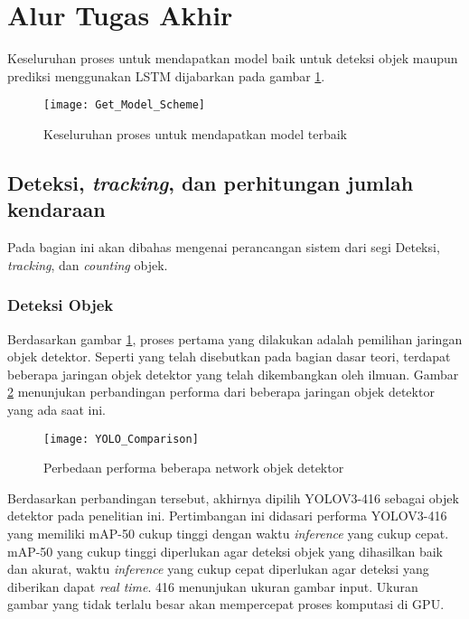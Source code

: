 \documentclass[../thesis.tex]{subfiles}
\begin{document}
\section{Alur Tugas Akhir}
Keseluruhan proses untuk mendapatkan model baik untuk deteksi objek maupun prediksi menggunakan LSTM dijabarkan pada gambar \ref{get_model_scheme}.
\begin{figure}[htp]
	\centering
	\texttt{[image: Get\_Model\_Scheme]}
	\caption{Keseluruhan proses untuk mendapatkan model terbaik}
	\label{get_model_scheme}
\end{figure}

\subsection{Deteksi, \textit{tracking}, dan perhitungan jumlah kendaraan}
Pada bagian ini akan dibahas mengenai perancangan sistem dari segi Deteksi, \textit{tracking}, dan \textit{counting} objek.
\subsubsection{Deteksi Objek}
Berdasarkan gambar \ref{get_model_scheme}, proses pertama yang dilakukan adalah pemilihan jaringan objek detektor. Seperti yang telah disebutkan pada bagian dasar teori, terdapat beberapa jaringan objek detektor yang telah dikembangkan oleh ilmuan. 
Gambar \ref{yolo_comparison} menunjukan perbandingan performa dari beberapa jaringan objek detektor yang ada saat ini.
\begin{figure}
	\centering
	\texttt{[image: YOLO\_Comparison]}
	\caption{Perbedaan performa beberapa network objek detektor}
	\label{yolo_comparison}
\end{figure}

Berdasarkan perbandingan tersebut, akhirnya dipilih YOLOV3-416 sebagai objek detektor pada penelitian ini. Pertimbangan ini didasari performa YOLOV3-416 yang memiliki mAP-50 cukup tinggi dengan waktu \textit{inference} yang cukup cepat. 
mAP-50 yang cukup tinggi diperlukan agar deteksi objek yang dihasilkan baik dan akurat, waktu \textit{inference} yang cukup cepat diperlukan agar deteksi yang diberikan dapat \textit{real time}. 416 menunjukan ukuran gambar input. Ukuran gambar yang tidak terlalu besar akan mempercepat proses komputasi di GPU.
\end{document}
